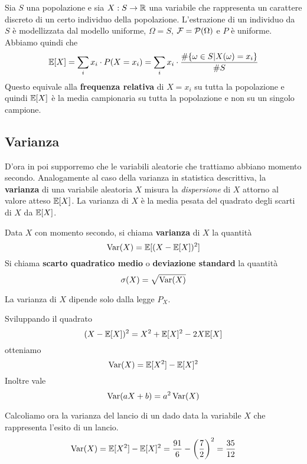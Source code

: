 \begin{example}
	Sia $S$ una popolazione e sia $X : S \to \mathbb{R}$ una variabile che rappresenta un carattere
	discreto di un certo individuo della popolazione. L'estrazione di un individuo da $S$ è
	modellizzata dal modello uniforme, $\Omega = S$, $\mathcal{F} = \mathcal{P}(\Omega)$ e $P$ è uniforme.
	Abbiamo quindi che
	\[
		\mathbb{E}[X] = \sum_i x_i \cdot P(X = x_i) =
		\sum_i x_i \cdot \frac{\# \{\omega \in S | X(\omega) = x_i\}}{\# S}
	\]
	Questo equivale alla \textbf{frequenza relativa} di $X = x_i$ su tutta la popolazione e quindi
	$\mathbb{E}[X]$ è la media campionaria su tutta la popolazione e non su un singolo campione.
\end{example}

\subsection{Varianza}
D'ora in poi supporremo che le variabili aleatorie che trattiamo abbiano momento secondo.
Analogamente al caso della varianza in statistica descrittiva, la \textbf{varianza} di una
variabile aleatoria $X$ misura la \emph{dispersione} di $X$ attorno al valore atteso $\mathbb{E}[X]$. La
varianza di $X$ è la media pesata del quadrato degli scarti di $X$ da $\mathbb{E}[X]$.

\begin{definition}
	Data $X$ con momento secondo, si chiama \textbf{varianza} di $X$ la quantità
	\[ \operatorname{Var}(X) = \mathbb{E}[(X - \mathbb{E}[X])^2] \]
	Si chiama \textbf{scarto quadratico medio} o \textbf{deviazione standard} la quantità
	\[ \sigma(X) = \sqrt{\operatorname{Var}(X)} \]
\end{definition}

\begin{observation}
	La varianza di $X$ dipende solo dalla legge $P_X$.
\end{observation}

\begin{observation}
	Sviluppando il quadrato
	\[ (X - \mathbb{E}[X])^2 = X^2 + \mathbb{E}[X]^2 - 2 X \mathbb{E}[X] \]
	otteniamo
	\[ \operatorname{Var}(X) = \mathbb{E}[X^2] - \mathbb{E}[X]^2 \]
	Inoltre vale
	\[ \operatorname{Var}(aX + b) = a^2 \operatorname{Var}(X) \]
\end{observation}

\begin{example}
	Calcoliamo ora la varianza del lancio di un dado data la variabile $X$ che rappresenta l'esito
	di un lancio.
	\[ \operatorname{Var}(X) = \mathbb{E}[X^2] - \mathbb{E}[X]^2 = \frac{91}{6} - \left(\frac{7}{2}\right)^2 = \frac{35}{12} \]
\end{example}

